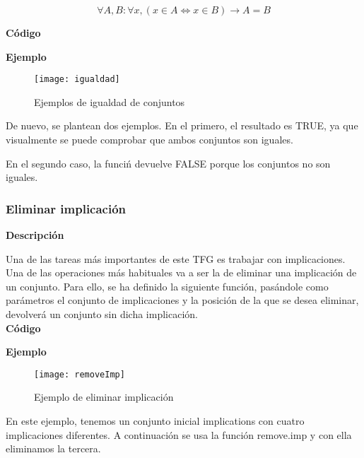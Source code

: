     \[
    \forall A, B : \forall x, (x \in A \Leftrightarrow x \in B) \to A = B
    \]


    \textbf{C\'odigo}

    


    \textbf{Ejemplo}

    \begin{figure}[H]
        \centering
        \texttt{[image: igualdad]}
        \caption{Ejemplos de igualdad de conjuntos}
        \label{fig:igualdad}
    \end{figure}

    De nuevo, se plantean dos ejemplos. En el primero, el resultado es TRUE, ya que visualmente se puede comprobar que ambos conjuntos son 
    iguales.

    En el segundo caso, la funci\'n devuelve FALSE porque los conjuntos no son iguales.




\subsubsection{Eliminar implicaci\'on}

    \textbf{Descripci\'on}

    Una de las tareas m\'as importantes de este TFG es trabajar con implicaciones. Una de las operaciones m\'as habituales 
    va a ser la de eliminar una implicaci\'on de un conjunto. Para ello, se ha definido la siguiente funci\'on, pas\'andole 
    como par\'ametros el conjunto de implicaciones y la posici\'on de la que se desea eliminar, devolver\'a un conjunto sin 
    dicha implicaci\'on.
    \\


    \textbf{C\'odigo}

    


    \textbf{Ejemplo}

    \begin{figure}[H]
        \centering
        \texttt{[image: removeImp]}
        \caption{Ejemplo de eliminar implicaci\'on}
        \label{fig:removeImp}
    \end{figure}

    En este ejemplo, tenemos un conjunto inicial implications con cuatro implicaciones diferentes. A continuaci\'on se usa la 
    funci\'on remove.imp y con ella eliminamos la tercera.

